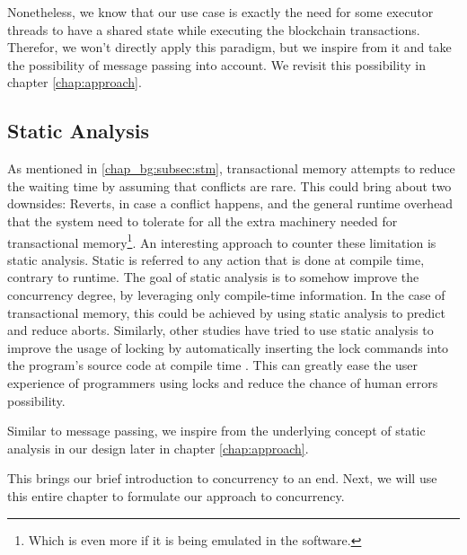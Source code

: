 Nonetheless, we know that our use case is exactly the need for some executor threads to have a
shared state while executing the blockchain transactions. Therefor, we won't directly apply this
paradigm, but we inspire from it and take the possibility of message passing into account. We
revisit this possibility in chapter \ref{chap:approach}.

\subsection{Static Analysis}

As mentioned in \ref{chap_bg:subsec:stm}, transactional memory attempts to reduce the waiting time
by assuming that conflicts are rare. This could bring about two downsides: Reverts, in case a
conflict happens, and the general runtime overhead that the system need to tolerate for all the
extra machinery needed for transactional memory\footnote{Which is even more if it is being emulated
in the software.}. An interesting approach to counter these limitation is static analysis. Static is
referred to any action that is done at compile time, contrary to runtime. The goal of static
analysis is to somehow improve the concurrency degree, by leveraging only compile-time information.
In the case of transactional memory, this could be achieved by using static analysis to predict and
reduce aborts\cite{diasEfficientCorrectTransactional}. Similarly, other studies have tried to use
static analysis to improve the usage of locking by automatically inserting the lock commands into
the program's source code at compile time \cite{cheremInferringLocksAtomic2007}. This can greatly
ease the user experience of programmers using locks and reduce the chance of human errors
possibility.

Similar to message passing, we inspire from the underlying concept of static analysis in our design
later in chapter \ref{chap:approach}.

This brings our brief introduction to concurrency to an end. Next, we will use this entire chapter
to formulate our approach to concurrency.

